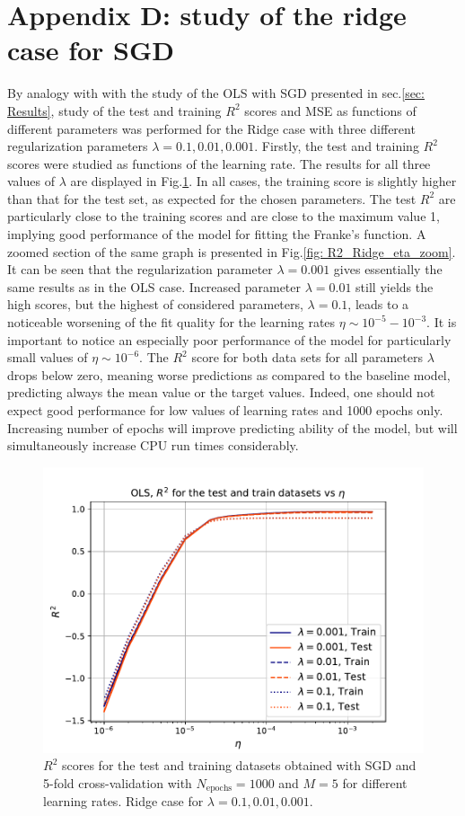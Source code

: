 \documentclass{emulateapj}
\begin{document}
\section{Appendix D: study of the ridge case for SGD}
\label{Appendix:D}

By analogy with with the study of the OLS with SGD presented in sec.\ref{sec: Results}, study of the test and training $R^2$ scores and MSE as functions of different parameters was performed for the Ridge case with three different regularization parameters $\lambda=0.1,0.01,0.001$. Firstly, the test and training $R^2$ scores were studied as functions of the learning rate. The results for all three values of $\lambda$ are displayed in Fig.\ref{fig: R2_Ridge_eta}. In all cases, the training score is slightly higher than that for the test set, as expected for the chosen parameters. The test $R^2$ are particularly close to the training scores and are close to the maximum value 1, implying good performance of the model for fitting the Franke's function. A zoomed section of the same graph is presented in Fig.\ref{fig: R2_Ridge_eta_zoom}. It can be seen that the regularization parameter $\lambda=0.001$ gives essentially the same results as in the OLS case. Increased parameter $\lambda=0.01$ still yields the high scores, but the highest of considered parameters, $\lambda=0.1$, leads to a noticeable worsening of the fit quality for the learning rates $\eta\sim 10^{-5}-10^{-3}$. It is important to notice an especially poor performance of the model for particularly small values of $\eta\sim 10^{-6}$. The $R^2$ score for both data sets for all parameters $\lambda$ drops below zero, meaning worse predictions as compared to the baseline model, predicting always the mean value or the target values. Indeed, one should not expect good performance for low values of learning rates and 1000 epochs only. Increasing number of epochs will improve predicting ability of the model, but will simultaneously increase CPU run times considerably.

\begin{figure}[h]
    \centering
    \includegraphics[width=.49\textwidth]{Figures/Ridge_R2_eta.pdf}
    \caption{$R^2$ scores for the test and training datasets obtained with SGD and 5-fold cross-validation with $N_{\mathrm{epochs}}=1000$ and $M=5$ for different learning rates. Ridge case for $\lambda=0.1,0.01,0.001$.}
    \label{fig: R2_Ridge_eta}
\end{figure}
\end{document}
